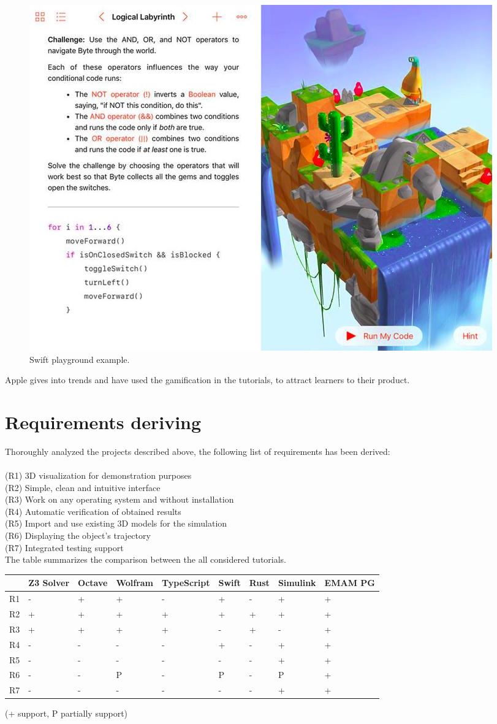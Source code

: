 \begin{figure}[h!]
    \centering
    \includegraphics[width=0.6\linewidth]{src/pic/swift}
    \caption{Swift playground example.}
    \label{fig:swift}
\end{figure}

Apple gives into trends and have used the gamification in the tutorials, to attract learners to their product.

\section{Requirements deriving}
Thoroughly analyzed the projects described above, the following list of requirements has been derived: \\\\
(R1) 3D visualization for demonstration purposes \\
(R2) Simple, clean and intuitive interface \\
(R3) Work on any operating system and without installation \\
(R4) Automatic verification of obtained results \\
(R5) Import and use existing 3D models for the simulation \\
(R6) Displaying the object's trajectory \\
(R7) Integrated testing support \\

The table summarizes the comparison between the all considered tutorials. \\
\begin{table}[h!]
    \begin{tabular}{|l|l|l|l|l|l|l|l|l|}
    \hline
    &  Z3 Solver & Octave & Wolfram & TypeScript & Swift & Rust & Simulink & EMAM PG \\ \hline
    R1 & - & + & + & - & + & - & + & + \\ \hline
    R2 & + & + & + & + & + & + & + & + \\ \hline
    R3 & + & + & + & + & - & + & - & + \\ \hline
    R4 & - & - & - & - & + & - & + & + \\ \hline
    R5 & - & - & - & - & - & - & + & + \\ \hline
    R6 & - & - & P & - & P & - & P & + \\ \hline
    R7 & - & - & - & - & - & - & + & + \\ \hline
    \end{tabular}
\end{table}
(+ support, P partially support) \\

